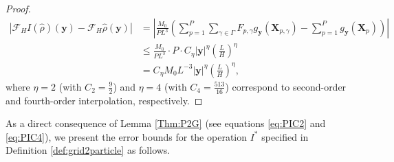 \documentclass[review,onefignum,onetabnum]{siamart250211}
\begin{document}
\begin{proof}
\begin{equation}
\begin{aligned}
\left|\mathcal{F}_H I(\hat{\rho})(\mathbf{y}) - \mathcal{F}_H \hat{\rho}(\mathbf{y}) \right| 
&= \left| \frac{M_0}{P L^3} \left( \sum_{p=1}^{P} \sum_{\gamma \in \Gamma} F_{p,\gamma} g_\mathbf{y}(\mathbf{X}_{p, \gamma}) - \sum_{p=1}^{P} g_\mathbf{y}(\mathbf{X}_p) \right) \right| \\
&\leq \frac{M_0}{PL^3} \cdot P \cdot C_\eta |\mathbf{y}|^\eta \left( \frac{L}{H} \right)^\eta \\
&= C_\eta M_0 L^{-3} |\mathbf{y}|^\eta \left( \frac{L}{H} \right)^\eta,
\end{aligned}
\end{equation}
where \( \eta = 2 \) (with \( C_2 = \frac{9}{2} \)) and \( \eta = 4 \) (with \( C_4 = \frac{513}{16} \)) correspond to second-order and fourth-order interpolation, respectively.
\end{proof}

As a direct consequence of Lemma \ref{Thm:P2G} (see equations \eqref{eq:PIC2} and \eqref{eq:PIC4}), we present the error bounds for the operation $I^*$ specified in Definition \ref{def:grid2particle} as follows.
\end{document}
